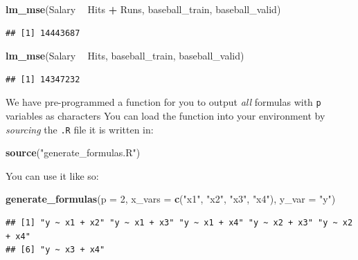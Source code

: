 \documentclass[12pt,]{article}
\newenvironment{Shaded}{\begin{snugshade}}{\end{snugshade}}
\newcommand{\DataTypeTok}[1]{\textcolor[rgb]{0.13,0.29,0.53}{#1}}
\newcommand{\DecValTok}[1]{\textcolor[rgb]{0.00,0.00,0.81}{#1}}
\newcommand{\KeywordTok}[1]{\textcolor[rgb]{0.13,0.29,0.53}{\textbf{#1}}}
\newcommand{\NormalTok}[1]{#1}
\newcommand{\OperatorTok}[1]{\textcolor[rgb]{0.81,0.36,0.00}{\textbf{#1}}}
\newcommand{\StringTok}[1]{\textcolor[rgb]{0.31,0.60,0.02}{#1}}
\begin{document}
\begin{Shaded}
\begin{Highlighting}[]
\KeywordTok{lm_mse}\NormalTok{(Salary }\OperatorTok{~}\StringTok{ }\NormalTok{Hits }\OperatorTok{+}\StringTok{ }\NormalTok{Runs, baseball_train, baseball_valid)}
\end{Highlighting}
\end{Shaded}

\begin{verbatim}
## [1] 14443687
\end{verbatim}

\begin{Shaded}
\begin{Highlighting}[]
\KeywordTok{lm_mse}\NormalTok{(Salary }\OperatorTok{~}\StringTok{ }\NormalTok{Hits, baseball_train, baseball_valid)}
\end{Highlighting}
\end{Shaded}

\begin{verbatim}
## [1] 14347232
\end{verbatim}

We have pre-programmed a function for you to output \emph{all} formulas
with \texttt{p} variables as characters You can load the function into
your environment by \emph{sourcing} the \texttt{.R} file it is written
in:

\begin{Shaded}
\begin{Highlighting}[]
\KeywordTok{source}\NormalTok{(}\StringTok{"generate_formulas.R"}\NormalTok{)}
\end{Highlighting}
\end{Shaded}

You can use it like so:

\begin{Shaded}
\begin{Highlighting}[]
\KeywordTok{generate_formulas}\NormalTok{(}\DataTypeTok{p =} \DecValTok{2}\NormalTok{, }\DataTypeTok{x_vars =} \KeywordTok{c}\NormalTok{(}\StringTok{"x1"}\NormalTok{, }\StringTok{"x2"}\NormalTok{, }\StringTok{"x3"}\NormalTok{, }\StringTok{"x4"}\NormalTok{), }\DataTypeTok{y_var =} \StringTok{"y"}\NormalTok{)}
\end{Highlighting}
\end{Shaded}

\begin{verbatim}
## [1] "y ~ x1 + x2" "y ~ x1 + x3" "y ~ x1 + x4" "y ~ x2 + x3" "y ~ x2 + x4"
## [6] "y ~ x3 + x4"
\end{verbatim}
\end{document}
